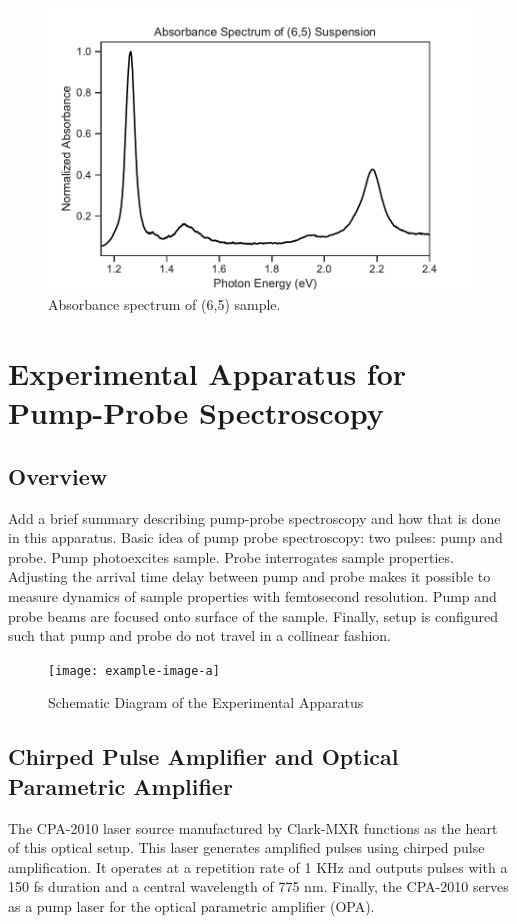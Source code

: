 \begin{figure}[H]
	\centering
	\includegraphics[scale=0.7]{images/chapter_methods/sample_absorbance}
	\caption{ Absorbance spectrum of (6,5) sample.}
	\label{fig:sample_absorbance}
\end{figure}

\section{Experimental Apparatus for Pump-Probe Spectroscopy}

\subsection{Overview}
{\color{red} Add a brief summary describing pump-probe spectroscopy and how that is done in this apparatus}. Basic idea of pump probe spectroscopy: two pulses: pump and probe. Pump photoexcites sample. Probe interrogates sample properties. Adjusting the arrival time delay between pump and probe makes it possible to measure dynamics of sample properties with femtosecond resolution. Pump and probe beams are focused onto surface of the sample. Finally, setup is configured such that pump and probe do not travel in a collinear fashion. 


\begin{figure}[h]
	\centering
	\texttt{[image: example-image-a]}
	\caption{ Schematic Diagram of the Experimental Apparatus}
	\label{fig:setup_schematic}
\end{figure}


\subsection{Chirped Pulse Amplifier and Optical Parametric Amplifier}
The CPA-2010 laser source manufactured by Clark-MXR functions as the heart of this optical setup. This laser generates amplified pulses using chirped pulse amplification. It operates at a repetition rate of 1 KHz and outputs pulses with a 150 fs duration and a central wavelength of 775 nm. Finally, the CPA-2010 serves as a pump laser for the optical parametric amplifier (OPA). 

